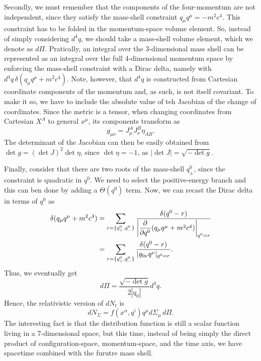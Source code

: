 Secondly, we must remember that the components of the four-momentum are not independent, since they satisfy the mass-shell constraint $q_\mu q^\mu = -m^2c^4$. This constraint has to be folded in the momentum-space volume element. So, instead of simply considering $d^4q$, we should take a mass-shell volume element, which we denote as $d\Pi$. Pratically, an integral over the 3-dimensional mass shell can be represented as an integral over the full 4-dimensional momentum space by enforcing the mass-shell constraint with a Dirac delta, namely with $d^4q\,\delta(q_\mu q^\mu + m^2c^4)$. Note, however, that $d^4q$ is constructed from Cartesian coordinate components of the momentum and, as such, is not itself covariant. To make it so, we have to include the absolute value of teh Jacobian of the change of coordinates. Since the
metric is a tensor, when changing coordinates from Cartesian $X^A$ to general $x^\mu$, its components
transform as 
\begin{equation}
    g_{\mu\nu} = J^A_\mu J^B_\nu \eta_{AB}.
\end{equation}
The determinant of the Jacobian can then be easily obtained from $\det{g} = (\det{J})^2\det{\eta}$, since $\det{\eta} = -1$, as $|\det{J}| = \sqrt{-\det{g}}$. 

Finally, consider that there are two roots of the mass-shell $q^0_\pm$, since the constraint is quadratic
in $q^0$. We need to select the positive-energy branch and this can ben done by adding a $\Theta(q^0)$ term.
Now, we can recast the Dirac delta in terms of $q^0$ as
\begin{equation}
    \begin{split}
        \delta(q_\mu q^\mu + m^2c^4) &= \sum_{r = \{q^0_+,q^0_-\}}\frac{\delta(q^0 - r)}{\bigg|\dfrac{\partial}{\partial q^0}(q_\mu q^\mu + m^2c^4)\bigg|_{q^0 = r}} \\
        &= \sum_{r = \{q^0_+,q^0_-\}}\frac{\delta(q^0 - r)}{|g_{0\nu}q^\nu|_{q^0 = r}}.
    \end{split} 
\end{equation}
Thus, we eventually get 
\begin{equation}
    d\Pi = \frac{\sqrt{-\det{g}}}{2|q_0|}d^3q.
\end{equation}
Hence, the relativistic version of $dN_t$ is 
\begin{equation}
\label{eq: fundamental phase-space volume element in GR}
    dN_\Sigma = f(x^\alpha,q^i)q^\mu d\Sigma_\mu\,d\Pi.
\end{equation}
The interesting fact is that the distribution function is still a scalar function living in a 7-dimensional space, but this time, instead of being simply the direct product of configuration-space, momentum-space, and the time axis, we have spacetime combined with the furutre mass shell. 

